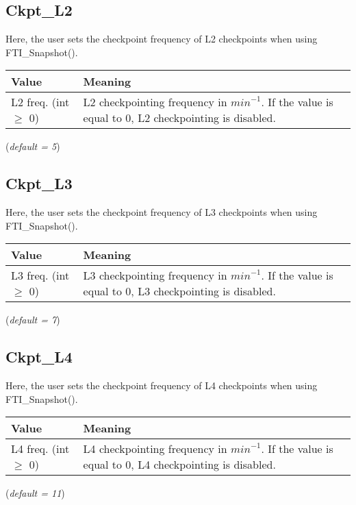 \documentclass{refrep}
\begin{document}
\subsection{Ckpt\_L2}\label{subsec:ckptl2}
Here, the user sets the checkpoint frequency of L2 checkpoints when using FTI\_Snapshot().
\begin{center}
\begin{tabular}[h!]{|p{}|p{}|}
\hline
\textbf{Value} & \textbf{Meaning} \\ \hline
L2 freq. (int $\geq$ 0)  & L2 checkpointing frequency in $\textit{min}^{-1}$. If the value is equal to 0, L2 checkpointing is disabled.  \\ \hline
\end{tabular}
\end{center}
(\textit{default = 5})
\subsection{Ckpt\_L3}\label{subsec:ckptl3}
Here, the user sets the checkpoint frequency of L3 checkpoints when using FTI\_Snapshot().
\begin{center}
\begin{tabular}[h!]{|p{}|p{}|}
\hline
\textbf{Value} & \textbf{Meaning} \\ \hline
L3 freq. (int $\geq$ 0)  & L3 checkpointing frequency in $\textit{min}^{-1}$. If the value is equal to 0, L3 checkpointing is disabled.  \\ \hline
\end{tabular}
\end{center}
(\textit{default = 7})
\subsection{Ckpt\_L4}\label{subsec:ckptl4}
Here, the user sets the checkpoint frequency of L4 checkpoints when using FTI\_Snapshot().
\begin{center}
\begin{tabular}[h!]{|p{}|p{}|}
\hline
\textbf{Value} & \textbf{Meaning} \\ \hline
L4 freq. (int $\geq$ 0)  & L4 checkpointing frequency in $\textit{min}^{-1}$. If the value is equal to 0, L4 checkpointing is disabled.  \\ \hline
\end{tabular}
\end{center}
(\textit{default = 11})
\end{document}
